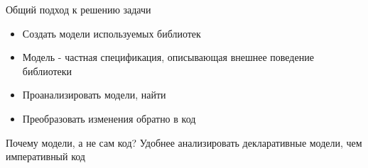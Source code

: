 \documentclass[12pt]{beamer}
\begin{document}
{
\begin{frame}{Общий подход к решению задачи}
\begin{mybox}[]
\begin{itemize}
	\item Создать модели используемых библиотек
	\item Модель - частная спецификация, описывающая внешнее поведение библиотеки
	\item Проанализировать модели, найти 
	\item Преобразовать изменения обратно в код
\end{itemize}
\end{mybox}

\begin{alertblock}{Почему модели, а не сам код?}
Удобнее анализировать декларативные модели, чем императивный код
\end{alertblock}
\end{frame}
}
\end{document}
